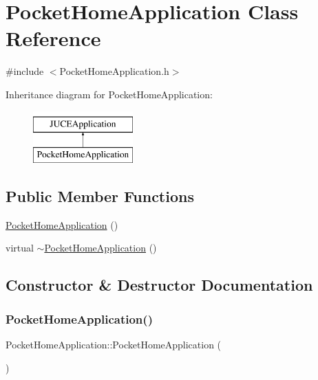 \hypertarget{classPocketHomeApplication}{}\section{Pocket\+Home\+Application Class Reference}
\label{classPocketHomeApplication}


{\ttfamily \#include $<$Pocket\+Home\+Application.\+h$>$}

Inheritance diagram for Pocket\+Home\+Application\+:\begin{figure}[H]
\begin{center}
\leavevmode
\includegraphics[height=2.000000cm]{classPocketHomeApplication}
\end{center}
\end{figure}
\subsection*{Public Member Functions}
\begin{DoxyCompactItemize}
\item 
\mbox{\hyperlink{classPocketHomeApplication_ac06b413dd3e63c03369e553248ed00af}{Pocket\+Home\+Application}} ()
\item 
virtual \mbox{\hyperlink{classPocketHomeApplication_afc564af8e987cd7f9f71ac9e446d6da3}{$\sim$\+Pocket\+Home\+Application}} ()
\end{DoxyCompactItemize}


\subsection{Constructor \& Destructor Documentation}
\mbox{\label{classPocketHomeApplication_ac06b413dd3e63c03369e553248ed00af}} 
\subsubsection{\texorpdfstring{Pocket\+Home\+Application()}{PocketHomeApplication()}}
{\footnotesize\ttfamily Pocket\+Home\+Application\+::\+Pocket\+Home\+Application (\begin{DoxyParamCaption}{ }\end{DoxyParamCaption})\hspace{0.3cm}{\ttfamily [inline]}}

